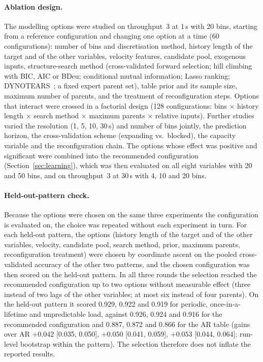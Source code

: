 \paragraph{Ablation design.}
The modelling options were studied on throughput~3 at 1\,s with 20 bins, starting from a reference configuration and changing one option at a time (60 configurations): number of bins and discretisation method, history length of the target and of the other variables, velocity features, candidate pool, exogenous inputs, structure-search method (cross-validated forward selection; hill climbing with BIC, AIC or BDeu; conditional mutual information; Lasso ranking; DYNOTEARS~\cite{dynotears}; a fixed expert parent set), table prior and its sample size, maximum number of parents, and the treatment of reconfiguration steps.
Options that interact were crossed in a factorial design (128 configurations: bins $\times$ history length $\times$ search method $\times$ maximum parents $\times$ relative inputs).
Further studies varied the resolution (1, 5, 10, 30\,s) and number of bins jointly, the prediction horizon, the cross-validation scheme (expanding vs.\ blocked), the capacity variable and the reconfiguration chain.
The options whose effect was positive and significant were combined into the recommended configuration (Section~\ref{sec:learning}), which was then evaluated on all eight variables with 20 and 50 bins, and on throughput~3 at 30\,s with 4, 10 and 20 bins.

\paragraph{Held-out-pattern check.}
Because the options were chosen on the same three experiments the configuration is evaluated on, the choice was repeated without each experiment in turn.
For each held-out pattern, the options (history length of the target and of the other variables, velocity, candidate pool, search method, prior, maximum parents, reconfiguration treatment) were chosen by coordinate ascent on the pooled cross-validated accuracy of the other two patterns, and the chosen configuration was then scored on the held-out pattern.
In all three rounds the selection reached the recommended configuration up to two options without measurable effect (three instead of two lags of the other variables; at most six instead of four parents).
On the held-out pattern it scored 0.929, 0.922 and 0.919 for periodic, once-in-a-lifetime and unpredictable load, against 0.926, 0.924 and 0.916 for the recommended configuration and 0.887, 0.872 and 0.866 for the AR table (gains over AR $+0.042$ [0.035, 0.050], $+0.050$ [0.041, 0.059], $+0.053$ [0.044, 0.064]; run-level bootstrap within the pattern).
The selection therefore does not inflate the reported results.


